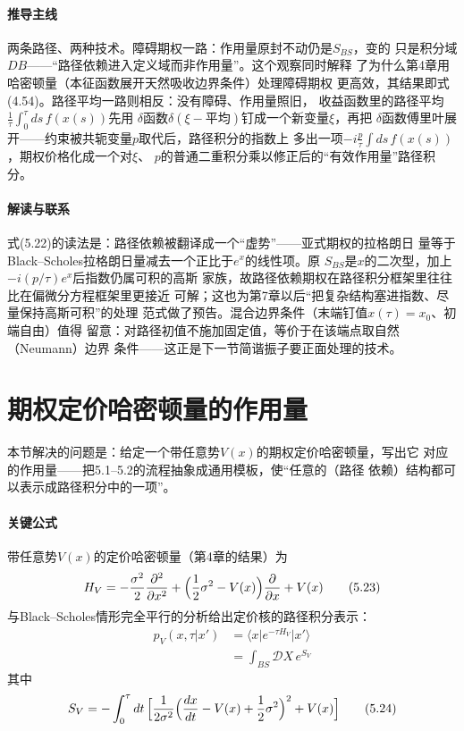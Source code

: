 \paragraph{推导主线}
两条路径、两种技术。障碍期权一路：作用量原封不动仍是$S_{BS}$，变的
只是积分域$DB$——“路径依赖进入定义域而非作用量”。这个观察同时解释
了为什么第4章用哈密顿量（本征函数展开天然吸收边界条件）处理障碍期权
更高效，其结果即式(4.54)。路径平均一路则相反：没有障碍、作用量照旧，
收益函数里的路径平均$\frac{1}{\tau}\int_{0}^{\tau}ds\,f(x(s))$先用
$\delta$函数$\delta(\xi-\text{平均})$钉成一个新变量$\xi$，再把
$\delta$函数傅里叶展开——约束被共轭变量$p$取代后，路径积分的指数上
多出一项$-i\frac{p}{\tau}\int ds\,f(x(s))$，期权价格化成一个对$\xi$、
$p$的普通二重积分乘以修正后的“有效作用量”路径积分。

\paragraph{解读与联系}
式(5.22)的读法是：路径依赖被翻译成一个“虚势”——亚式期权的拉格朗日
量等于Black--Scholes拉格朗日量减去一个正比于$e^{x}$的线性项。原
$S_{BS}$是$x$的二次型，加上$-i(p/\tau)e^{x}$后指数仍属可积的高斯
家族，故路径依赖期权在路径积分框架里往往比在偏微分方程框架里更接近
可解；这也为第7章以后“把复杂结构塞进指数、尽量保持高斯可积”的处理
范式做了预告。混合边界条件（末端钉值$x(\tau)=x_{0}$、初端自由）值得
留意：对路径初值不施加固定值，等价于在该端点取自然（Neumann）边界
条件——这正是下一节简谐振子要正面处理的技术。

\section{期权定价哈密顿量的作用量}

本节解决的问题是：给定一个带任意势$V(x)$的期权定价哈密顿量，写出它
对应的作用量——把5.1--5.2的流程抽象成通用模板，使“任意的（路径
依赖）结构都可以表示成路径积分中的一项”。

\paragraph{关键公式}
带任意势$V(x)$的定价哈密顿量（第4章的结果）为
\begin{equation*}
H_{V}=-\frac{\sigma^{2}}{2}\frac{\partial^{2}}{\partial x^{2}}
+\Bigl(\frac{1}{2}\sigma^{2}-V(x)\Bigr)\frac{\partial}{\partial x}
+V(x)
\tag{5.23}
\end{equation*}
与Black--Scholes情形完全平行的分析给出定价核的路径积分表示：
\begin{align*}
p_{V}(x,\tau\vert x')&=\langle x\vert e^{-\tau H_{V}}\vert x'\rangle\\
&=\int_{BS}\mathcal{D}X\,e^{S_{V}}
\end{align*}
其中
\begin{equation*}
S_{V}=-\int_{0}^{\tau}dt\,
\Bigl[\frac{1}{2\sigma^{2}}\Bigl(\frac{dx}{dt}-V(x)+\frac{1}{2}\sigma^{2}\Bigr)^{2}
+V(x)\Bigr]
\tag{5.24}
\end{equation*}

